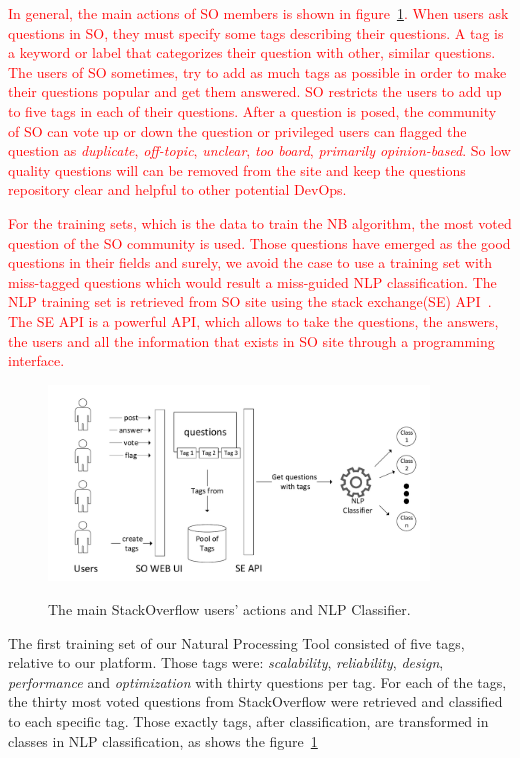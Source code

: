 \textcolor{red}{In general, the main actions of SO members is shown in figure~\ref{fig:stackoverflow_questions}. When users ask questions in SO, they must specify some tags describing their questions. A tag is a keyword or label that categorizes their question with other, similar questions. The users of SO sometimes, try to add as much tags as possible in order to make their questions popular and get them answered. SO restricts the users to add up to five tags in each of their questions. After a question is posed, the community of SO can vote up or down the question or privileged users can flagged the question as \emph{duplicate}, \emph{off-topic}, \emph{unclear}, \emph{too board}, \emph{primarily opinion-based}. So low quality questions will can be removed from the site and keep the questions repository clear and helpful to other potential DevOps.}

\textcolor{red}{For the training sets, which is the data to train the NB algorithm, the most voted question of the SO community is used. Those questions have emerged as the good questions in their fields and surely, we avoid the case to use a training set with miss-tagged questions which would result a miss-guided NLP classification. The NLP training set is retrieved from SO site using the stack exchange(SE) API~\cite{stackexchange_url}. The SE API is a powerful API, which allows to take the questions, the answers, the users and all the information that exists in SO site through a programming interface.} 

\begin{figure}[h]
	\caption{The main StackOverflow users' actions and NLP Classifier. }
	\includegraphics[width=0.9\textwidth]{./fig/StackOverFlow.pdf}
	\centering
	\label{fig:stackoverflow_questions}
\end{figure}

The first training set of our Natural Processing Tool consisted of five tags, relative to our platform. Those tags were: \emph{scalability}, \emph{reliability}, \emph{design}, \emph{performance} and \emph{optimization} with thirty questions per tag. For each of the tags, the thirty most voted questions from StackOverflow were retrieved and classified to each specific tag. Those exactly tags, after classification, are transformed in classes in NLP classification, as shows the figure~\ref{fig:stackoverflow_questions}

